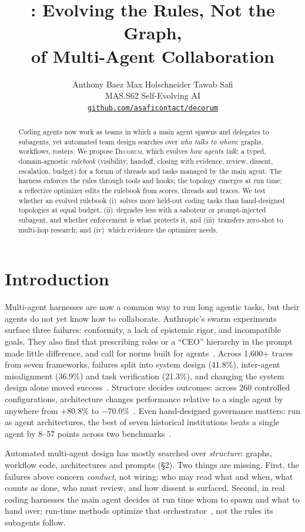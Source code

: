 \documentclass{article}
\title{\dec: Evolving the Rules, Not the Graph,\\of Multi-Agent Collaboration}
\author{%
  Anthony Baez \qquad Max Holschneider \qquad Tawab Safi\\
  MAS.S62 Self-Evolving AI\\
  \texttt{\href{https://github.com/asaficontact/decorum}{github.com/asaficontact/decorum}}
}
\newcommand{\dec}{\textsc{Decorum}}
\begin{document}
\maketitle

\begin{abstract}
Coding agents now work as teams in which a main agent spawns and delegates to subagents, yet automated team design searches over \emph{who talks to whom}: graphs, workflows, rosters.
We propose \dec, which evolves \emph{how agents talk}: a typed, domain-agnostic \emph{rulebook} (visibility, handoff, closing with evidence, review, dissent, escalation, budget) for a forum of threads and tasks managed by the main agent.
The harness enforces the rules through tools and hooks; the topology emerges at run time; a reflective optimizer edits the rulebook from scores, threads and traces.
We test whether an evolved rulebook (i)~solves more held-out coding tasks than hand-designed topologies at equal budget, (ii)~degrades less with a saboteur or prompt-injected subagent, and whether enforcement is what protects it, and (iii)~transfers zero-shot to multi-hop research; and (iv)~which evidence the optimizer needs.
\end{abstract}

\section{Introduction}

Multi-agent harnesses are now a common way to run long agentic tasks, but their agents do not yet know how to collaborate.
Anthropic's swarm experiments surface three failures: conformity, a lack of epistemic rigor, and incompatible goals.
They also find that prescribing roles or a ``CEO'' hierarchy in the prompt made little difference, and call for norms built for agents~\citep{anthropic2026patterns}.
Across 1{,}600+ traces from seven frameworks, failures split into system design (41.8\%), inter-agent misalignment (36.9\%) and task verification (21.3\%), and changing the system design alone moved success~\citep{cemri2025why}.
Structure decides outcomes: across 260 controlled configurations, architecture changes performance relative to a single agent by anywhere from $+80.8\%$ to $-70.0\%$~\citep{kim2025towards}. Even hand-designed governance matters: run as agent architectures, the best of seven historical institutions beats a single agent by 8--57 points across two benchmarks~\citep{fei2026when}.

Automated multi-agent design has mostly searched over \emph{structure}: graphs, workflow code, architectures and prompts (\S2).
Two things are missing.
First, the failures above concern \emph{conduct}, not wiring: who may read what and when, what counts as done, who must review, and how dissent is surfaced.
Second, in real coding harnesses the main agent decides at run time whom to spawn and what to hand over; run-time methods optimize that orchestrator~\citep{dang2025multi,ruan2026aorchestra}, not the rules its subagents follow.
\end{document}
